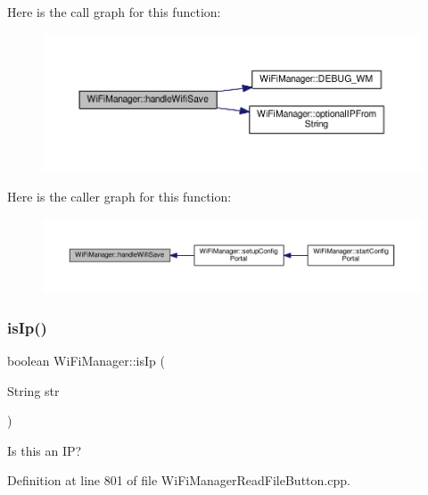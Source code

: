 Here is the call graph for this function\+:\nopagebreak
\begin{figure}[H]
\begin{center}
\leavevmode
\includegraphics[width=350pt]{d4/dc8/class_wi_fi_manager_a2a8c2b60aa86dfdeab8a1a90f7122dc7_cgraph}
\end{center}
\end{figure}
Here is the caller graph for this function\+:\nopagebreak
\begin{figure}[H]
\begin{center}
\leavevmode
\includegraphics[width=350pt]{d4/dc8/class_wi_fi_manager_a2a8c2b60aa86dfdeab8a1a90f7122dc7_icgraph}
\end{center}
\end{figure}
\mbox{\label{class_wi_fi_manager_a9c78a8774f746ec22a99d03a53baa607}} 
\subsubsection{\texorpdfstring{is\+Ip()}{isIp()}}
{\footnotesize\ttfamily boolean Wi\+Fi\+Manager\+::is\+Ip (\begin{DoxyParamCaption}\item[{String}]{str }\end{DoxyParamCaption})\hspace{0.3cm}{\ttfamily [private]}}

Is this an IP? 

Definition at line 801 of file Wi\+Fi\+Manager\+Read\+File\+Button.\+cpp.



